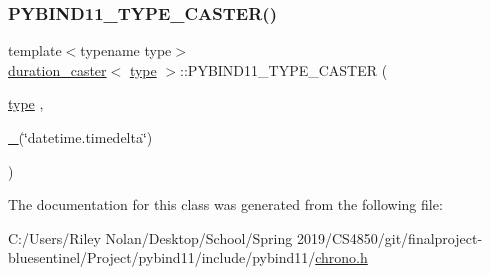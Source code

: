 \mbox{\label{classduration__caster_a3518d09fefb62b0be79c37d79c298822}} 
\subsubsection{\texorpdfstring{PYBIND11\_TYPE\_CASTER()}{PYBIND11\_TYPE\_CASTER()}}
{\footnotesize\ttfamily template$<$typename type$>$ \\
\mbox{\hyperlink{classduration__caster}{duration\+\_\+caster}}$<$ \mbox{\hyperlink{_s_d_l__opengl_8h_ad5ddf6fca7b585646515660e810e0188}{type}} $>$\+::P\+Y\+B\+I\+N\+D11\+\_\+\+T\+Y\+P\+E\+\_\+\+C\+A\+S\+T\+ER (\begin{DoxyParamCaption}\item[{\mbox{\hyperlink{_s_d_l__opengl_8h_ad5ddf6fca7b585646515660e810e0188}{type}}}]{,  }\item[{\mbox{\hyperlink{descr_8h_af114703e20c6527e87163eb2798f74b8}{\+\_\+}}(\char`\"{}datetime.\+timedelta\char`\"{})}]{ }\end{DoxyParamCaption})}



The documentation for this class was generated from the following file\+:\begin{DoxyCompactItemize}
\item 
C\+:/\+Users/\+Riley Nolan/\+Desktop/\+School/\+Spring 2019/\+C\+S4850/git/finalproject-\/bluesentinel/\+Project/pybind11/include/pybind11/\mbox{\hyperlink{chrono_8h}{chrono.\+h}}\end{DoxyCompactItemize}

